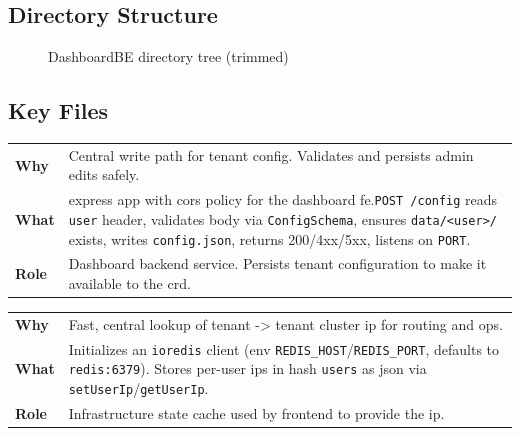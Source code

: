\documentclass[11pt, a4paper, oneside, listof=totoc]{scrartcl}
\makeatletter
\newcommand{\codesummary}[3]{%
    \vspace{0.4\baselineskip}%
    \noindent\begin{tabularx}{\linewidth}{@{}>{\bfseries}l X@{}}
    Why  & #1\\
    What & #2\\
    Role & #3\\
    \end{tabularx}%
    \vspace{0.2\baselineskip}%
}
\makeatother
\begin{document}
            \subsection{Directory Structure}
            \begin{figure}[H]
                \centering
                \caption{DashboardBE directory tree (trimmed)}\label{fig:dashboardbe-tree}
            \end{figure}

        \clearpage

            \subsection{Key Files}
                \codesummary
                    {Central write path for tenant config. Validates and persists admin edits safely.}
                    {\gls{express} app with \gls{cors} policy for the dashboard \gls{fe}.\@\texttt{POST /config} reads \texttt{user} header, validates body via \texttt{ConfigSchema}, ensures \texttt{data/<user>/} exists, writes \texttt{config.json}, returns 200/4xx/5xx, listens on \texttt{PORT}.}
                    {Dashboard backend service. Persists tenant configuration to make it available to the \gls{crd}.}

                \codesummary
                    {Fast, central lookup of tenant -> tenant cluster \gls{ip} for routing and ops.}
                    {Initializes an \texttt{ioredis} client (env \texttt{REDIS\_HOST}/\texttt{REDIS\_PORT}, defaults to \texttt{redis:6379}). Stores per-user \glspl{ip} in hash \texttt{users} as \gls{json} via \texttt{setUserIp}/\texttt{getUserIp}.}
                    {Infrastructure state cache used by frontend to provide the \gls{ip}.}
\end{document}
